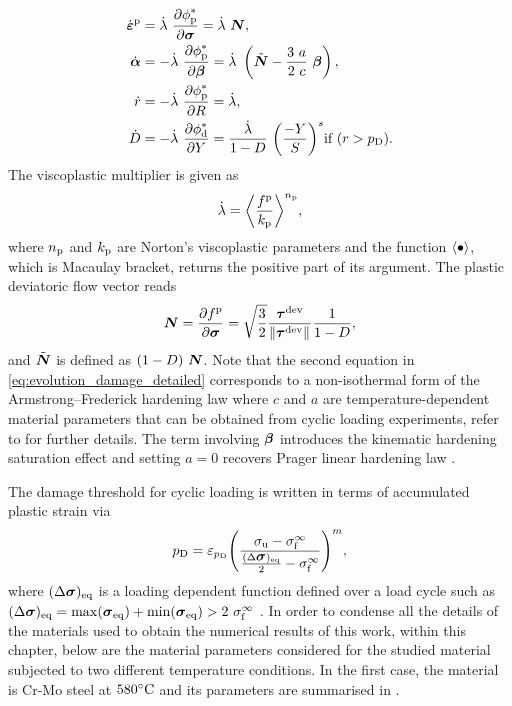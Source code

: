 \newcommand{\lam}{\fu^\ast}
\begin{equation}
	\begin{split}
		{\dot{\mbox{$\bm \varepsilon $}}}^{\rm p} &= \dot{\lambda} \  \displaystyle\frac{\displaystyle\partial \phi^{\ast}_{\rm p}}{\displaystyle\partial \mbox{$\bm \sigma$}} = \dot{\lambda} \  \mbox{$\bm  N$},\\
		{\dot{\mbox{$\bm \alpha$}}} &=- \dot{\lambda} \  \displaystyle\frac{\displaystyle\partial \phi^{\ast}_{\rm p}}{\displaystyle\partial \mbox{$\bm \beta$}} = \dot{\lambda} \   \left( {\tilde{\mbox{$\bm  N$}}} - \frac{3 \  a}{2 \  c} \  \mbox{$\bm \beta$} \right),\\
		\dot{r} &= - \dot{\lambda} \  \displaystyle\frac{\displaystyle\partial \phi^{\ast}_{\rm p}}{\displaystyle\partial R} = \dot{\lambda},\\
		{\dot{D}} &= - \dot{\lambda} \  \displaystyle\frac{\displaystyle\partial \phi^{\ast}_{\rm d}}{\displaystyle\partial Y}= \frac{\dot{\lambda}}{1-D} \  {\left( \frac{-Y}{S} \right)}^{s} \text{if } (r > p_{\rm D}).\\
	\end{split}
	\label{eq:evolution_damage_detailed}
\end{equation}
The viscoplastic multiplier is given as
\begin{equation}
	\dot{\lambda} = {\left\langle \frac{f^{\rm p}}{k_{\rm p}} \right\rangle}^{{n_{\rm p}}},
\end{equation}
where ${n_{\rm p}}$ and $k_{\rm p}$ are Norton's viscoplastic parameters and the function $\langle \bullet \rangle$, which is Macaulay bracket, returns the positive part of its argument. The plastic deviatoric flow vector reads
\begin{equation}
	\mbox{$\bm  N$} = \displaystyle\frac{\displaystyle\partial f^{\rm p}}{\displaystyle\partial \mbox{$\bm \sigma$}} = \sqrt{\frac{3}{2}} \frac{\mbox{$\bm \tau$}^{\rm dev}}{ \left\lVert \mbox{$\bm \tau$}^{\rm dev} \right\rVert_{}} \frac{1}{1-D},
\end{equation}
and ${\tilde{\mbox{$\bm  N$}}}$ is defined as $(1-D) \  \mbox{$\bm  N$}$. Note that the second equation in \eqref{eq:evolution_damage_detailed} corresponds to a non-isothermal form of the Armstrong–Frederick hardening law where $c$ and $a$ are temperature-dependent material parameters that can be obtained from cyclic loading experiments, refer to \parencite{de2011computational} for further details. The term involving $\mbox{$\bm \beta$}$ introduces the kinematic hardening saturation effect and setting $a=0$ recovers Prager linear hardening law \parencite{lemaitre2005engineering}.

The damage threshold for cyclic loading is written in terms of accumulated plastic strain via
\begin{equation}
	p_{\rm D} = \varepsilon_{p_{\rm D}} {\left( \frac{\sigma_{\rm u} - \sigma_{\rm f}^\infty}{\frac{(\Delta \mbox{$\bm \sigma$})_{\rm eq}}{2} - \sigma_{\rm f}^\infty} \right)}^{m},
\end{equation}
where $(\Delta \mbox{$\bm \sigma$})_{\rm eq}$ is a loading dependent function defined over a load cycle such as $(\Delta \mbox{$\bm \sigma$})_{\rm eq} = \max(\mbox{$\bm \sigma$}_{\rm eq}) + \min(\mbox{$\bm \sigma$}_{\rm eq}) > 2 \  \sigma_{\rm f}^\infty$ \parencite{lemaitre2005engineering}. In order to condense all the details of the materials used to obtain the numerical results of this work, within this chapter, below are the material parameters considered for the studied material subjected to two different temperature conditions. In the first case, the material is Cr-Mo steel at $580^\circ \rm C$ and its parameters are summarised in  \parencite{lemaitre2005engineering}.


